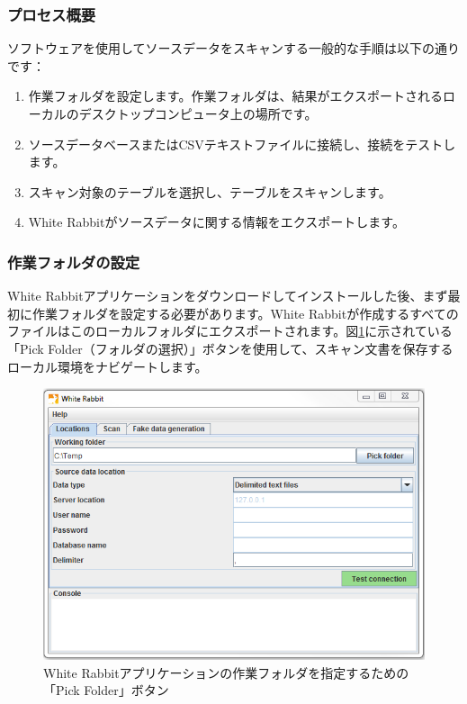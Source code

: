 \documentclass[
  11pt]{book}
\providecommand{\tightlist}{%
  \setlength{\itemsep}{0pt}\setlength{\parskip}{0pt}}
\theoremstyle{definition}
\theoremstyle{definition}
\theoremstyle{definition}
\theoremstyle{definition}
\theoremstyle{remark}
\begin{document}
\subsubsection*{プロセス概要}\label{ux30d7ux30edux30bbux30b9ux6982ux8981}

ソフトウェアを使用してソースデータをスキャンする一般的な手順は以下の通りです：

\begin{enumerate}
\def\labelenumi{\arabic{enumi}.}
\tightlist
\item
  作業フォルダを設定します。作業フォルダは、結果がエクスポートされるローカルのデスクトップコンピュータ上の場所です。
\item
  ソースデータベースまたはCSVテキストファイルに接続し、接続をテストします。
\item
  スキャン対象のテーブルを選択し、テーブルをスキャンします。
\item
  White Rabbitがソースデータに関する情報をエクスポートします。
\end{enumerate}

\subsubsection*{作業フォルダの設定}\label{ux4f5cux696dux30d5ux30a9ux30ebux30c0ux306eux8a2dux5b9a}

White Rabbitアプリケーションをダウンロードしてインストールした後、まず最初に作業フォルダを設定する必要があります。White Rabbitが作成するすべてのファイルはこのローカルフォルダにエクスポートされます。図\ref{fig:WhiteRabbitLocation}に示されている「Pick Folder（フォルダの選択）」ボタンを使用して、スキャン文書を保存するローカル環境をナビゲートします。

\begin{figure}

{\centering \includegraphics[width=1\linewidth]{images/ExtractTransformLoad/WhiteRabbitLocation} 

}

\caption{White Rabbitアプリケーションの作業フォルダを指定するための「Pick Folder」ボタン}\label{fig:WhiteRabbitLocation}
\end{figure}
\end{document}
